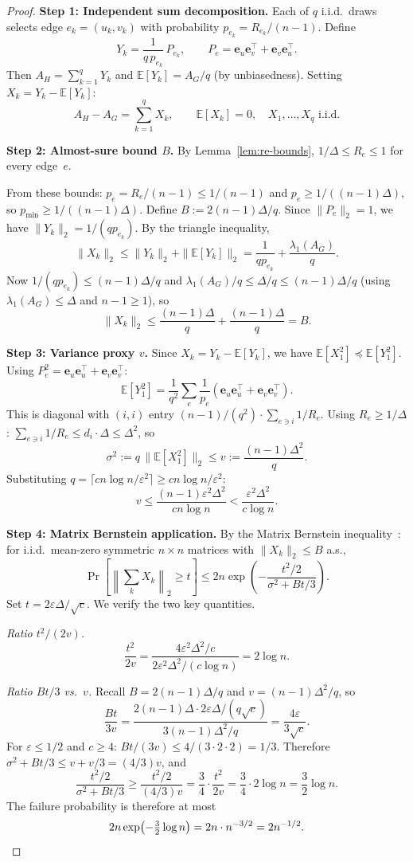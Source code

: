 \documentclass[11pt]{article}
\theoremstyle{definition}
\newcommand{\eps}{\varepsilon}
\newcommand{\lamG}{\lambda_1(A_G)}
\newcommand{\AG}{A_G}
\newcommand{\AH}{A_H}
\newcommand{\be}{\mathbf{e}}
\newcommand{\E}{\mathbb{E}}
\begin{document}
\begin{proof}
\textbf{Step 1: Independent sum decomposition.}
Each of $q$ i.i.d.\ draws selects edge $e_k = (u_k, v_k)$ with probability
$p_{e_k} = R_{e_k}/(n-1)$. Define
\[
Y_k = \frac{1}{q\,p_{e_k}}\,P_{e_k}, \qquad
P_e = \be_u \be_v^\top + \be_v \be_u^\top.
\]
Then $\AH = \sum_{k=1}^q Y_k$ and $\E[Y_k] = \AG/q$ (by unbiasedness).
Setting $X_k = Y_k - \E[Y_k]$:
\[
\AH - \AG = \sum_{k=1}^q X_k, \qquad \E[X_k] = 0, \quad X_1, \ldots, X_q \text{ i.i.d.}
\]

\textbf{Step 2: Almost-sure bound $B$.}
By Lemma~\ref{lem:re-bounds}, $1/\Delta \leq R_e \leq 1$ for every edge~$e$.

From these bounds: $p_e = R_e/(n-1) \leq 1/(n-1)$ and
$p_e \geq 1/((n-1)\Delta)$, so $p_{\min} \geq 1/((n-1)\Delta)$.
Define $B := 2(n-1)\Delta/q$.
Since $\|P_e\|_2 = 1$, we have $\|Y_k\|_2 = 1/(qp_{e_k})$.
By the triangle inequality,
\[
\|X_k\|_2 \leq \|Y_k\|_2 + \|\E[Y_k]\|_2
= \frac{1}{qp_{e_k}} + \frac{\lamG}{q}.
\]
Now $1/(qp_{e_k}) \leq (n-1)\Delta/q$ and $\lamG/q \leq \Delta/q \leq (n-1)\Delta/q$
(using $\lamG \leq \Delta$ and $n - 1 \geq 1$), so
\[
\|X_k\|_2 \leq \frac{(n-1)\Delta}{q} + \frac{(n-1)\Delta}{q} = B.
\]

\textbf{Step 3: Variance proxy $v$.}
Since $X_k = Y_k - \E[Y_k]$, we have
$\E[X_1^2] \preceq \E[Y_1^2]$.
Using $P_e^2 = \be_u\be_u^\top + \be_v\be_v^\top$:
\[
\E[Y_1^2] = \frac{1}{q^2}\sum_e \frac{1}{p_e}(\be_u\be_u^\top + \be_v\be_v^\top).
\]
This is diagonal with $(i,i)$ entry $(n-1)/(q^2) \cdot \sum_{e \ni i} 1/R_e$.
Using $R_e \geq 1/\Delta$: $\sum_{e \ni i} 1/R_e \leq d_i \cdot \Delta \leq \Delta^2$, so
\[
\sigma^2 := q\,\|\E[X_1^2]\|_2 \leq v := \frac{(n-1)\Delta^2}{q}.
\]
Substituting $q = \lceil cn\log n/\eps^2 \rceil \geq cn\log n/\eps^2$:
\begin{equation}\label{eq:v-bound}
v \leq \frac{(n-1)\eps^2\Delta^2}{cn\log n}
< \frac{\eps^2\Delta^2}{c\log n}.
\end{equation}

\textbf{Step 4: Matrix Bernstein application.}
By the Matrix Bernstein inequality~\citep{tropp2012user}: for i.i.d.\ mean-zero
symmetric $n \times n$ matrices with $\|X_k\|_2 \leq B$ a.s.,
\[
\Pr\!\left[\left\|\textstyle\sum_k X_k\right\|_2 \geq t\right]
\leq 2n\exp\!\left(-\frac{t^2/2}{\sigma^2 + Bt/3}\right).
\]
Set $t = 2\eps\Delta/\sqrt{c}$. We verify the two key quantities.

\medskip\noindent\emph{Ratio $t^2/(2v)$.}
\[
\frac{t^2}{2v}
= \frac{4\eps^2\Delta^2/c}{2\eps^2\Delta^2/(c\log n)}
= 2\log n.
\]

\medskip\noindent\emph{Ratio $Bt/3$ vs.\ $v$.}
Recall $B = 2(n-1)\Delta/q$ and $v = (n-1)\Delta^2/q$, so
\[
\frac{Bt}{3v}
= \frac{2(n-1)\Delta \cdot 2\eps\Delta/(q\sqrt{c})}{3(n-1)\Delta^2/q}
= \frac{4\eps}{3\sqrt{c}}.
\]
For $\eps \leq 1/2$ and $c \geq 4$: $Bt/(3v) \leq 4/(3 \cdot 2 \cdot 2) = 1/3$.
Therefore $\sigma^2 + Bt/3 \leq v + v/3 = (4/3)v$, and
\[
\frac{t^2/2}{\sigma^2 + Bt/3}
\geq \frac{t^2/2}{(4/3)v}
= \frac{3}{4} \cdot \frac{t^2}{2v}
= \frac{3}{4} \cdot 2\log n
= \frac{3}{2}\log n.
\]
The failure probability is therefore at most
\[
2n \exp\!\left(-\tfrac{3}{2}\log n\right)
= 2n \cdot n^{-3/2} = 2n^{-1/2}. \qedhere
\]
\end{proof}
\end{document}
